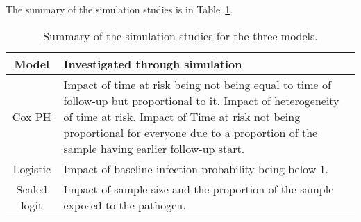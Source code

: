 The summary of the simulation studies is in Table~\ref{tab:sim-summary}.

\begin{table}[htp]
    \centering
    \caption{
        \label{tab:sim-summary}
        Summary of the simulation studies for the three models.
    }
    \begin{tabular}{cp{25em}}
    \toprule
    Model & Investigated through simulation \\
    \midrule
    Cox PH & Impact of time at risk being not being equal to time of follow-up but proportional to it. Impact of heterogeneity of time at risk. Impact of Time at risk not being proportional for everyone due to a proportion of the sample having earlier follow-up start. \\
    Logistic & Impact of baseline infection probability being below 1. \\
    Scaled logit & Impact of sample size and the proportion of the sample exposed to the pathogen. \\
    \bottomrule
    \end{tabular}
\end{table}
